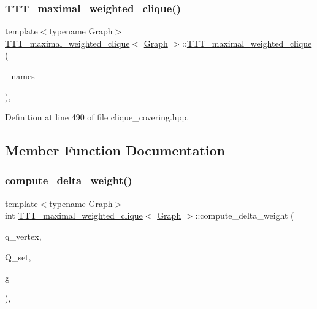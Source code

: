 \subsubsection{\texorpdfstring{T\+T\+T\+\_\+maximal\+\_\+weighted\+\_\+clique()}{TTT\_maximal\_weighted\_clique()}}
{\footnotesize\ttfamily template$<$typename Graph$>$ \\
\hyperlink{classTTT__maximal__weighted__clique}{T\+T\+T\+\_\+maximal\+\_\+weighted\+\_\+clique}$<$ \hyperlink{structGraph}{Graph} $>$\+::\hyperlink{classTTT__maximal__weighted__clique}{T\+T\+T\+\_\+maximal\+\_\+weighted\+\_\+clique} (\begin{DoxyParamCaption}\item[{std\+::map$<$ \hyperlink{clique__covering__graph_8hpp_a9cb45047ea8c5ed95a8cfa90494345aa}{C\+\_\+vertex}, std\+::string $>$ \&}]{\+\_\+names }\end{DoxyParamCaption})\hspace{0.3cm}{\ttfamily [inline]}, {\ttfamily [explicit]}}



Definition at line 490 of file clique\+\_\+covering.\+hpp.



\subsection{Member Function Documentation}
\mbox{\label{classTTT__maximal__weighted__clique_a60a5925a276d2ff69e125c0754fb3127}} 
\subsubsection{\texorpdfstring{compute\+\_\+delta\+\_\+weight()}{compute\_delta\_weight()}}
{\footnotesize\ttfamily template$<$typename Graph$>$ \\
int \hyperlink{classTTT__maximal__weighted__clique}{T\+T\+T\+\_\+maximal\+\_\+weighted\+\_\+clique}$<$ \hyperlink{structGraph}{Graph} $>$\+::compute\+\_\+delta\+\_\+weight (\begin{DoxyParamCaption}\item[{\hyperlink{classTTT__maximal__weighted__clique_ac6a30ba8fb726c9c83eafe9dc451a799}{vertex}}]{q\+\_\+vertex,  }\item[{\hyperlink{classCustomUnorderedSet}{Custom\+Unordered\+Set}$<$ \hyperlink{classTTT__maximal__weighted__clique_ac6a30ba8fb726c9c83eafe9dc451a799}{vertex} $>$}]{Q\+\_\+set,  }\item[{const \hyperlink{structGraph}{Graph} \&}]{g }\end{DoxyParamCaption})\hspace{0.3cm}{\ttfamily [inline]}, {\ttfamily [private]}}



